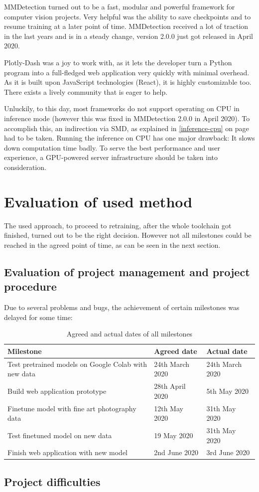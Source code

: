 MMDetection turned out to be a fast, modular and powerful framework for computer vision projects. Very helpful was the ability to save checkpoints and to resume training at a later point of time. MMDetection received a lot of traction in the last years and is in a steady change, version 2.0.0 just got released in April 2020.

Plotly-Dash was a joy to work with, as it lets the developer turn a Python program into a full-fledged web application very quickly with minimal overhead. As it is built upon JavaScript technologies (React), it is highly customizable too. There exists a lively community that is eager to help.

Unluckily, to this day, most frameworks do not support operating on CPU in inference mode (however this was fixed in MMDetection 2.0.0 in April 2020). To accomplish this, an indirection via SMD, as explained in \ref{inference-cpu} on page \pageref{inference-cpu} had to be taken. Running the inference on CPU has one major drawback: It slows down computation time badly. To serve the best performance and user experience, a GPU-powered server infrastructure should be taken into consideration.

\section{Evaluation of used method}

The used approach, to proceed to retraining, after the whole toolchain got finished, turned out to be the right decision. However not all milestones could be reached in the agreed point of time, as can be seen in the next section.

\subsection{Evaluation of project management and project procedure}

Due to several problems and bugs, the achievement of certain milestones was delayed for some time:

\begin{table}[H]
\begin{tabular}{@{}lll@{}}
\toprule
Milestone & Agreed date & Actual date \\ \midrule
Test pretrained models on Google Colab with new data & 24th March 2020 & 24th March 2020 \\
Build web application prototype & 28th April 2020 & 5th May 2020 \\
Finetune model with fine art photography data & 12th May 2020 & 31th May 2020 \\
Test finetuned model on new data & 19 May 2020 & 31th May 2020 \\
Finish web application with new model & 2nd June 2020 & 3rd June 2020
\end{tabular}
\caption{Agreed and actual dates of all milestones}
\label{tab:milestones}
\end{table}
	
\subsection{Project difficulties}

